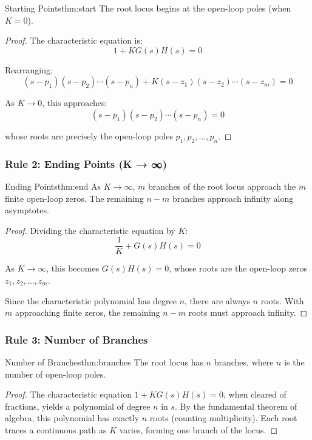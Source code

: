 \begin{theorem}{Starting Points}{thm:start}
The root locus begins at the open-loop poles (when $K = 0$).
\end{theorem}

\begin{proof}
The characteristic equation is:
\[
1 + KG(s)H(s) = 0
\]

Rearranging:
\[
(s-p_1)(s-p_2)\cdots(s-p_n) + K(s-z_1)(s-z_2)\cdots(s-z_m) = 0
\]

As $K \to 0$, this approaches:
\[
(s-p_1)(s-p_2)\cdots(s-p_n) = 0
\]

whose roots are precisely the open-loop poles $p_1, p_2, \ldots, p_n$.
\end{proof}

\subsubsection{Rule 2: Ending Points (K → ∞)}

\begin{theorem}{Ending Points}{thm:end}
As $K \to \infty$, $m$ branches of the root locus approach the $m$ finite open-loop zeros. The remaining $n - m$ branches approach infinity along asymptotes.
\end{theorem}

\begin{proof}
Dividing the characteristic equation by $K$:
\[
\frac{1}{K} + G(s)H(s) = 0
\]

As $K \to \infty$, this becomes $G(s)H(s) = 0$, whose roots are the open-loop zeros $z_1, z_2, \ldots, z_m$.

Since the characteristic polynomial has degree $n$, there are always $n$ roots. With $m$ approaching finite zeros, the remaining $n - m$ roots must approach infinity.
\end{proof}

\subsubsection{Rule 3: Number of Branches}

\begin{theorem}{Number of Branches}{thm:branches}
The root locus has $n$ branches, where $n$ is the number of open-loop poles.
\end{theorem}

\begin{proof}
The characteristic equation $1 + KG(s)H(s) = 0$, when cleared of fractions, yields a polynomial of degree $n$ in $s$. By the fundamental theorem of algebra, this polynomial has exactly $n$ roots (counting multiplicity). Each root traces a continuous path as $K$ varies, forming one branch of the locus.
\end{proof}


